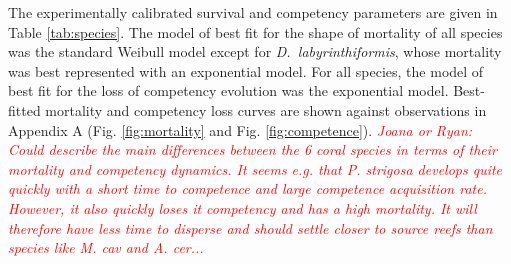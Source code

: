 \documentclass[preprint,12pt,authoryear]{elsarticle}
\newcommand{\emphc}[1]{\emph{\textcolor{red}{#1}}}
\begin{document}
	The experimentally calibrated survival and competency parameters are given in Table \ref{tab:species}.  The model of best fit for the shape of mortality of all species was the standard Weibull model except for \textit{D.~labyrinthiformis}, whose mortality was best represented with an exponential model. For all species, the model of best fit for the loss of competency evolution was the exponential model. Best-fitted mortality and competency loss curves are shown against observations in Appendix A (Fig. \ref{fig:mortality} and Fig. \ref{fig:competence}). \emphc{Joana or Ryan: Could describe the main differences between the 6 coral species in terms of their mortality and competency dynamics. It seems e.g. that P. strigosa develops quite quickly with a short time to competence and large competence acquisition rate. However, it also quickly loses it competency and has a high mortality. It will therefore have less time to disperse and should settle closer to source reefs than species like M. cav and A. cer...}
	
	
	
\end{document}
